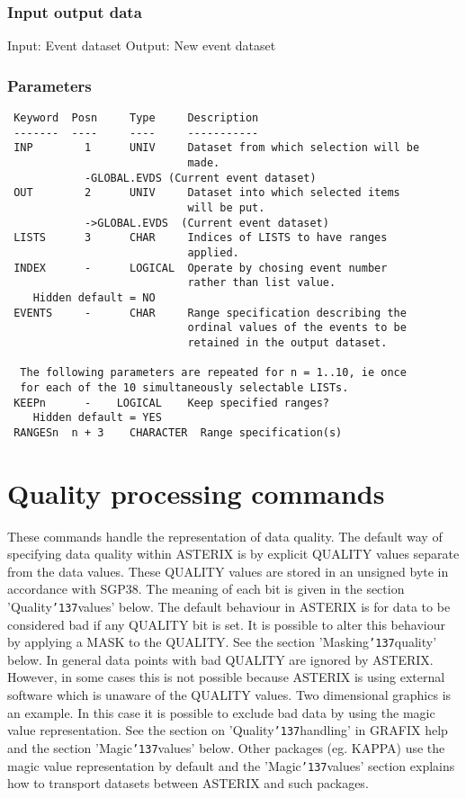 \documentclass{book}
\renewcommand{\_}{{\tt\char'137}}     %
\begin{document}
\subsection{Input output data}
Input: Event dataset
Output: New event dataset
\subsection{Parameters}
\begin{verbatim}
 Keyword  Posn     Type     Description
 -------  ----     ----     -----------
 INP        1      UNIV     Dataset from which selection will be
                            made.
            -GLOBAL.EVDS (Current event dataset)
 OUT        2      UNIV     Dataset into which selected items
                            will be put.
            ->GLOBAL.EVDS  (Current event dataset)
 LISTS      3      CHAR     Indices of LISTS to have ranges
                            applied.
 INDEX      -      LOGICAL  Operate by chosing event number
                            rather than list value.
    Hidden default = NO
 EVENTS     -      CHAR     Range specification describing the
                            ordinal values of the events to be
                            retained in the output dataset.

  The following parameters are repeated for n = 1..10, ie once
  for each of the 10 simultaneously selectable LISTs.
 KEEPn      -    LOGICAL    Keep specified ranges?
    Hidden default = YES
 RANGESn  n + 3    CHARACTER  Range specification(s)

\end{verbatim}\chapter{Quality processing commands}
These commands handle the representation of data quality. The default
way of specifying data quality within ASTERIX is by explicit QUALITY
values separate from the data values. These QUALITY values are stored
in an unsigned byte in accordance with SGP38. The meaning of each bit
is given in the section 'Quality\_values' below. The default behaviour
in ASTERIX is for data to be considered bad if any QUALITY bit is set.
It is possible to alter this behaviour by applying a MASK to the QUALITY.
See the section 'Masking\_quality' below. In general data points with bad
QUALITY are ignored by ASTERIX. However, in some cases this is not
possible because ASTERIX is using external software which is unaware of
the QUALITY values. Two dimensional graphics is an example. In this
case it is possible to exclude bad data by using the magic value
representation. See the section on 'Quality\_handling' in GRAFIX help
and the section 'Magic\_values' below. Other packages (eg. KAPPA) use
the magic value representation by default and the 'Magic\_values' section
explains how to transport datasets between ASTERIX and such packages.
\end{document}
